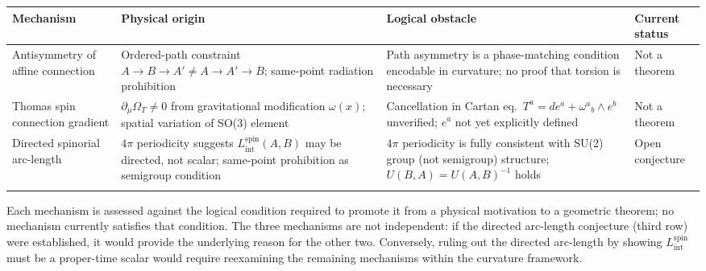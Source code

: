 \documentclass[%
 reprint,
 amsmath,amssymb,
 aps,
 prb,
]{revtex4-2}
\numberwithin{equation}{section}
\newcommand{\Lspin}{L_{\text{int}}^{\text{spin}}}
\newcommand{\omeff}{\omega(x)}
\newcommand{\OmT}{\Omega_{T}}
\begin{document}
\begin{table}[t!]
\label{tab:mechanisms}
\renewcommand{\arraystretch}{1.5}
\setlength{\tabcolsep}{7pt}
\begin{tabular}{p{4.5cm}p{4.5cm}p{4.5cm}p{2.5cm}}
\toprule
\textbf{Mechanism} & \textbf{Physical origin} & \textbf{Logical obstacle} & \textbf{Current status} \\
\midrule
Antisymmetry of affine connection
& Ordered-path constraint $A\!\to\!B\!\to\!A' \neq A\!\to\!A'\!\to\!B$; same-point radiation prohibition
& Path asymmetry is a phase-matching condition encodable in curvature; no proof that torsion is necessary
& Not a theorem \\
\addlinespace[0.3cm]
Thomas spin connection gradient
& $\partial_\mu\OmT \neq 0$ from gravitational modification $\omeff$; spatial variation of SO(3) element
& Cancellation in Cartan eq.\ $T^a = de^a + \omega^a{}_b \wedge e^b$ unverified; $e^a$ not yet explicitly defined
& Not a theorem \\
\addlinespace[0.3cm]
Directed spinorial arc-length
& $4\pi$ periodicity suggests $\Lspin(A,B)$ may be directed, not scalar; same-point prohibition as semigroup condition
& $4\pi$ periodicity is fully consistent with SU(2) group (not semigroup) structure; $U(B,A) = U(A,B)^{-1}$ holds
& Open conjecture \\
\addlinespace[0.2cm]
\bottomrule
\end{tabular}
\vspace{0.2cm}
\begin{minipage}{0.95\textwidth}
\justifying\footnotesize
Each mechanism is assessed against the logical condition required to promote it from a physical motivation to a geometric theorem; no mechanism currently satisfies that condition. The three mechanisms are not independent: if the directed arc-length conjecture (third row) were established, it would provide the underlying reason for the other two. Conversely, ruling out the directed arc-length by showing $\Lspin$ must be a proper-time scalar would require reexamining the remaining mechanisms within the curvature framework.
\end{minipage}
\end{table}

\end{document}
